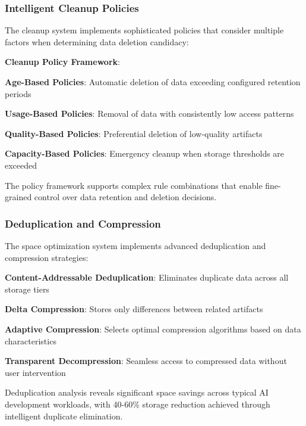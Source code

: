 \subsubsection*{Intelligent Cleanup Policies}

The cleanup system implements sophisticated policies that consider multiple factors when determining data deletion candidacy:

\begin{successbox}
\textbf{Cleanup Policy Framework}:
\begin{compactlist}
    \item \textbf{Age-Based Policies}: Automatic deletion of data exceeding configured retention periods
    \item \textbf{Usage-Based Policies}: Removal of data with consistently low access patterns
    \item \textbf{Quality-Based Policies}: Preferential deletion of low-quality artifacts
    \item \textbf{Capacity-Based Policies}: Emergency cleanup when storage thresholds are exceeded
\end{compactlist}
\end{successbox}

The policy framework supports complex rule combinations that enable fine-grained control over data retention and deletion decisions.

\subsubsection*{Deduplication and Compression}

The space optimization system implements advanced deduplication and compression strategies:

\begin{expandedlist}
    \item \textbf{Content-Addressable Deduplication}: Eliminates duplicate data across all storage tiers
    \item \textbf{Delta Compression}: Stores only differences between related artifacts
    \item \textbf{Adaptive Compression}: Selects optimal compression algorithms based on data characteristics
    \item \textbf{Transparent Decompression}: Seamless access to compressed data without user intervention
\end{expandedlist}

Deduplication analysis reveals significant space savings across typical AI development workloads, with 40-60\% storage reduction achieved through intelligent duplicate elimination.

